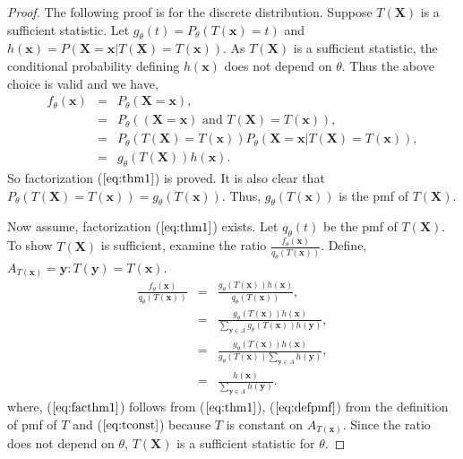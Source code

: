 \documentclass[a4paper,english,12pt]{article}
\newcommand{\bx}{\mathbf{x}}
\newcommand{\by}{\mathbf{y}}
\newcommand{\bX}{\mathbf{X}}
\begin{document}
\begin{proof}
The following proof is for the discrete distribution. Suppose $T(\bX)$ is a sufficient statistic. Let $g_\theta(t) = P_\theta (T(\bx)=t)$ and $h(\bx)=P(\bX=\bx|T(\bX)=T(\bx))$. As $T(\bX)$ is a sufficient statistic, the conditional probability defining $h(\bx)$ does not depend on $\theta$. Thus the above choice is valid and we have,
\begin{eqnarray}
f_\theta(\bx) &=& P_\theta(\bX=\bx), \nonumber \\
&=& P_\theta((\bX=\bx) \text { and } T(\bX)=T(\bx)),\nonumber \\
&=& P_\theta(T(\bX)= T(\bx))P_\theta(\bX=\bx | T(\bX)=T(\bx)),\nonumber \\
&=& g_\theta (T(\bX))h(\bx).
\end{eqnarray}
So factorization ($\ref{eq:thm1}$) is proved. It is also clear that $P_\theta(T(\bX)=T(\bx)) = g_\theta (T(\bx))$. Thus, $g_\theta (T(\bx))$ is the pmf of $T(\bX)$.
\par Now assume, factorization ($\ref{eq:thm1}$) exists. Let $q_\theta(t)$ be the pmf of $T(\bX)$. To show $T(\bX)$ is sufficient, examine the ratio $\frac{f_\theta (\bx)}{q_\theta (T(\bx))}$. Define, $ A_{T(\bx)}={\by:T(\by)=T(\bx)}$.
\begin{eqnarray}
\frac{f_\theta (\bx)}{q_\theta (T(\bx))} &=& \frac{g_\theta (T(\bx))h(\bx)}{q_\theta (T(\bx))}, \label{eq:facthm1}\\
&=& \frac{g_\theta (T(\bx))h(\bx)}{\sum_{\by \in A} {g_\theta (T(\bx))h(\by)}}, \label{eq:defpmf}\\
&=& \frac{g_\theta (T(\bx))h(\bx)}{g_\theta (T(\bx)) \sum_{\by \in A} {h(\by)}}, \label{eq:tconst}\\
&=& \frac{h(\bx)}{\sum_{\by \in A} {h(\by)}}. 
\end{eqnarray}
where, ($\ref{eq:facthm1}$) follows from ($\ref{eq:thm1}$), ($\ref{eq:defpmf}$) from the definition of pmf of $T$ and ($\ref{eq:tconst}$) because $T$ is constant on $ A_{T(\bx)}$.
Since the ratio does not depend on $\theta$, $T(\bX)$ is a sufficient statistic for $\theta$.
\end{proof}
\end{document}
